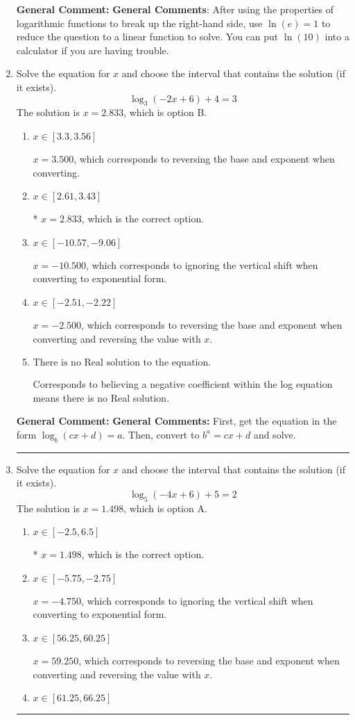 \documentclass{extbook}[14pt]
\newcommand{\litem}[1]{\item #1

\rule{\textwidth}{0.4pt}}
\begin{document}
\begin{enumerate}
{\textbf{General Comment:} \textbf{General Comments}: After using the properties of logarithmic functions to break up the right-hand side, use $\ln(e) = 1$ to reduce the question to a linear function to solve. You can put $\ln(10)$ into a calculator if you are having trouble.
}
\litem{
Solve the equation for $x$ and choose the interval that contains the solution (if it exists).
\[ \log_{3}{(-2x+6)}+4 = 3 \]The solution is \( x = 2.833 \), which is option B.\begin{enumerate}[label=\Alph*.]
\item \( x \in [3.3, 3.56] \)

$x = 3.500$, which corresponds to reversing the base and exponent when converting.
\item \( x \in [2.61, 3.43] \)

* $x = 2.833$, which is the correct option.
\item \( x \in [-10.57, -9.06] \)

$x = -10.500$, which corresponds to ignoring the vertical shift when converting to exponential form.
\item \( x \in [-2.51, -2.22] \)

$x = -2.500$, which corresponds to reversing the base and exponent when converting and reversing the value with $x$.
\item \( \text{There is no Real solution to the equation.} \)

Corresponds to believing a negative coefficient within the log equation means there is no Real solution.
\end{enumerate}

\textbf{General Comment:} \textbf{General Comments:} First, get the equation in the form $\log_b{(cx+d)} = a$. Then, convert to $b^a = cx+d$ and solve.
}
\litem{
Solve the equation for $x$ and choose the interval that contains the solution (if it exists).
\[ \log_{5}{(-4x+6)}+5 = 2 \]The solution is \( x = 1.498 \), which is option A.\begin{enumerate}[label=\Alph*.]
\item \( x \in [-2.5, 6.5] \)

* $x = 1.498$, which is the correct option.
\item \( x \in [-5.75, -2.75] \)

$x = -4.750$, which corresponds to ignoring the vertical shift when converting to exponential form.
\item \( x \in [56.25, 60.25] \)

$x = 59.250$, which corresponds to reversing the base and exponent when converting and reversing the value with $x$.
\item \( x \in [61.25, 66.25] \)


\end{enumerate}}
\end{enumerate}
\end{document}

